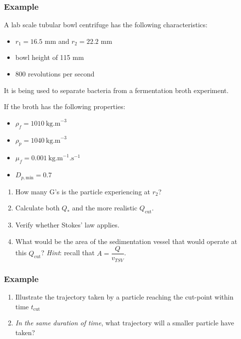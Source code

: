 \begin{frame}\frametitle{Example}
	A lab scale tubular bowl centrifuge has the following characteristics:
	\begin{itemize}
		\item	$r_1 = 16.5$ mm and $r_2 = 22.2$ mm
		\item	bowl height of 115 mm
		\item	800 revolutions per second
	\end{itemize}

	It is being used to separate bacteria from a fermentation broth experiment.
	
	
	If the broth has the following properties:
	\begin{itemize}
		\item	$\rho_f = 1010~\text{kg.m}^{-3}$   \hfill {\color{myOrange}{$\leftarrow$ note how close these are}}
		\item	$\rho_p = 1040~\text{kg.m}^{-3}$
		\item	$\mu_f = 0.001~\text{kg.m}^{-1}\text{.s}^{-1}$
		\item	$D_{p,\text{min}} = 0.7$ \micron   \hfill {\color{myOrange}{$\leftarrow$ note how small}}
	\end{itemize}
	\begin{enumerate}
		\item	How many G's is the particle experiencing at $r_2$?
		\item	Calculate both $Q_*$ and the more realistic $Q_\text{cut}$.
		\item	Verify whether Stokes' law applies.
		\item	What would be the area of the sedimentation vessel that would operate at this $Q_\text{cut}$? \emph{Hint}: recall that $A = \dfrac{Q}{v_{TSV}}$.
	\end{enumerate}
		
\end{frame}

\begin{frame}\frametitle{Example}
	\begin{enumerate}
		\item	Illustrate the trajectory taken by a particle reaching the cut-point within time $t_\text{cut}$
		\item	\emph{In the same duration of time}, what trajectory will a smaller particle have taken?
	\end{enumerate}
	\vspace{10cm}
\end{frame}

